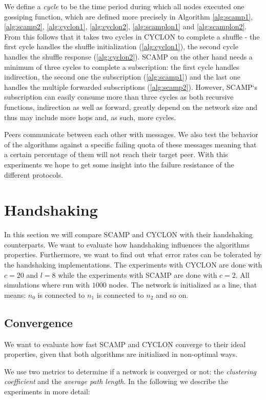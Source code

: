 \documentclass[11pt, english, screen]{report-rd-info}
\begin{document}
We define a \emph{cycle} to be the time period during which all nodes executed one gossiping function, which are defined more precisely in Algorithm \ref{alg:scamp1}, \ref{alg:scamp2}, \ref{alg:cyclon1}, \ref{alg:cyclon2}, \ref{alg:scamplon1} and \ref{alg:scamplon2}.
From this follows that it takes two cycles in CYCLON to complete a shuffle - the first cycle handles the shuffle initialization (\ref{alg:cyclon1}), the second cycle handles the shuffle response (\ref{alg:cyclon2}).
SCAMP on the other hand needs a minimum of three cycles to complete a subscription: the first cycle handles indirection, the second one the subscription (\ref{alg:scamp1}) and the last one handles the multiple forwarded subscriptions (\ref{alg:scamp2}).
However, SCAMP`s subscription can easily consume more than three cycles as both recursive functions, indirection as well as forward, greatly depend on the network size and thus may include more hops and, as such, more cycles.

Peers communicate between each other with messages.
We also test the behavior of the algorithms against a specific failing quota of these messages meaning that a certain percentage of them will not reach their target peer.
With this experiments we hope to get some insight into the failure resistance of the different protocols.

\section{Handshaking}

In this section we will compare SCAMP and CYCLON with their handshaking counterparts.
We want to evaluate how handshaking influences the algorithms properties.
Furthermore, we want to find out what error rates can be tolerated by the handshaking implementations.
The experiments with CYCLON are done with $c = 20$ and $l = 8$ while the experiments with SCAMP are done with $c=2$.
All simulations where run with $1000$ nodes.
The network is initialized as a line, that means: $n_0$ is connected to $n_1$ is connected to $n_2$ and so on.

\subsection{Convergence}

We want to evaluate how fast SCAMP and CYCLON converge to their ideal properties, given that both algorithms are initialized in non-optimal ways.

We use two metrics to determine if a network is converged or not: the \emph{clustering coefficient} and the \emph{average path length}.
In the following we describe the experiments in more detail:
\end{document}
